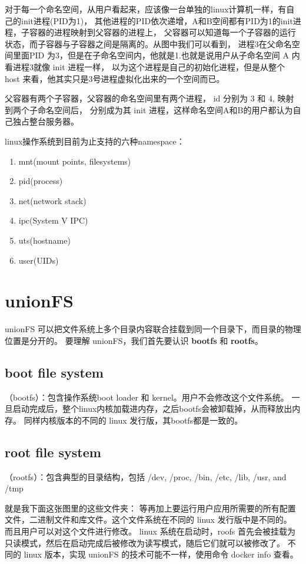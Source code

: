 对于每一个命名空间，从用户看起来，应该像一台单独的linux计算机一样，有自己的init进程(PID为1)，
其他进程的PID依次递增，A和B空间都有PID为1的init进程，子容器的进程映射到父容器的进程上，
父容器可以知道每一个子容器的运行状态，而子容器与子容器之间是隔离的。从图中我们可以看到，
进程3在父命名空间里面PID 为3，但是在子命名空间内，他就是1.也就是说用户从子命名空间 A 内看进程3就像 init 进程一样，
以为这个进程是自己的初始化进程，但是从整个 host 来看，他其实只是3号进程虚拟化出来的一个空间而已。

父容器有两个子容器，父容器的命名空间里有两个进程， id 分别为 3 和 4, 映射到两个子命名空间后，
分别成为其 init 进程，这样命名空间A和B的用户都认为自己独占整台服务器。

linux操作系统到目前为止支持的六种namespace：
\begin{enumerate}
    \item mnt(mount points, filesystems)
    \item pid(process)
    \item net(network stack)
    \item ipc(System V IPC)
    \item uts(hostname)
    \item user(UIDs)
\end{enumerate}

\section{unionFS}

unionFS 可以把文件系统上多个目录内容联合挂载到同一个目录下，而目录的物理位置是分开的。
要理解 unionFS，我们首先要认识 \textbf{bootfs} 和 \textbf{rootfs}。

\subsection{ boot file system}

（bootfs）：包含操作系统boot loader 和 kernel。用户不会修改这个文件系统。
一旦启动完成后，整个linux内核加载进内存，之后bootfs会被卸载掉，从而释放出内存。
同样内核版本的不同的 linux 发行版，其bootfs都是一致的。

\subsection{root file system}

（rootfs）：包含典型的目录结构，包括 /dev, /proc, /bin, /etc, /lib, /usr, and /tmp

就是我下面这张图里的这些文件夹：
等再加上要运行用户应用所需要的所有配置文件，二进制文件和库文件。这个文件系统在不同的 linux 发行版中是不同的。
而且用户可以对这个文件进行修改。
linux 系统在启动时，roofs 首先会被挂载为只读模式，然后在启动完成后被修改为读写模式，随后它们就可以被修改了。
不同的 linux 版本，实现 unionFS 的技术可能不一样，使用命令 docker info 查看。

